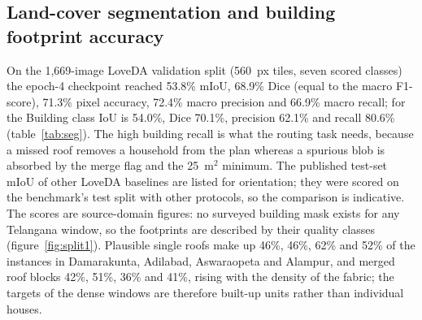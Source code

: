 \documentclass[10pt,a4paper,twocolumn]{article}
\begin{document}
\subsection{Land-cover segmentation and building footprint accuracy}\label{sec:res1}
On the 1{,}669-image LoveDA validation split (560~px tiles, seven scored classes) the epoch-4 checkpoint reached 53.8\% mIoU, 68.9\% Dice (equal to the macro F1-score), 71.3\% pixel accuracy, 72.4\% macro precision and 66.9\% macro recall; for the Building class IoU is 54.0\%, Dice 70.1\%, precision 62.1\% and recall 80.6\% (table~\ref{tab:seg}). The high building recall is what the routing task needs, because a missed roof removes a household from the plan whereas a spurious blob is absorbed by the merge flag and the 25~m$^2$ minimum. The published test-set mIoU of other LoveDA baselines are listed for orientation; they were scored on the benchmark's test split with other protocols, so the comparison is indicative. The scores are source-domain figures: no surveyed building mask exists for any Telangana window, so the footprints are described by their quality classes (figure~\ref{fig:split1}). Plausible single roofs make up 46\%, 46\%, 62\% and 52\% of the instances in Damarakunta, Adilabad, Aswaraopeta and Alampur, and merged roof blocks 42\%, 51\%, 36\% and 41\%, rising with the density of the fabric; the targets of the dense windows are therefore built-up units rather than individual houses.
\end{document}
